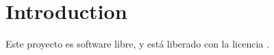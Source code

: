 \chapter{Introduction}

Este proyecto es software libre, y está liberado con la licencia \cite{gplv3}.